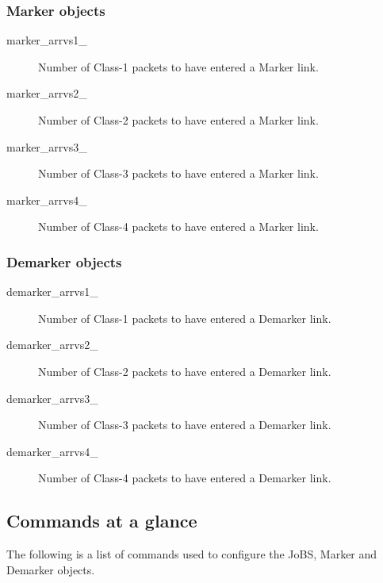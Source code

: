 \subsubsection{Marker objects}
\begin{description}
\item[marker\_arrvs1\_] 
Number of Class-1 packets to have entered a Marker link.
\item[marker\_arrvs2\_] 
Number of Class-2 packets to have entered a Marker link.
\item[marker\_arrvs3\_] 
Number of Class-3 packets to have entered a Marker link.
\item[marker\_arrvs4\_] 
Number of Class-4 packets to have entered a Marker link.
\end{description}
\subsubsection{Demarker objects}
\begin{description}
\item[demarker\_arrvs1\_] 
Number of Class-1 packets to have entered a Demarker link.
\item[demarker\_arrvs2\_] 
Number of Class-2 packets to have entered a Demarker link.
\item[demarker\_arrvs3\_] 
Number of Class-3 packets to have entered a Demarker link.
\item[demarker\_arrvs4\_] 
Number of Class-4 packets to have entered a Demarker link.
\end{description}

\subsection{Commands at a glance}
The following is a list of commands used to configure the JoBS, Marker and 
Demarker objects.

